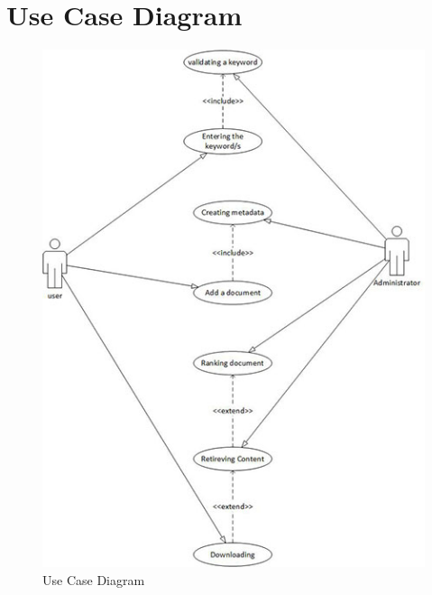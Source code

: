 \section{Use Case Diagram}
\begin{figure}[h]
\begin{center}
\includegraphics[scale=0.8]{use_case_diagram}
\end{center}
\caption{Use Case Diagram}
\end{figure}

\newpage
